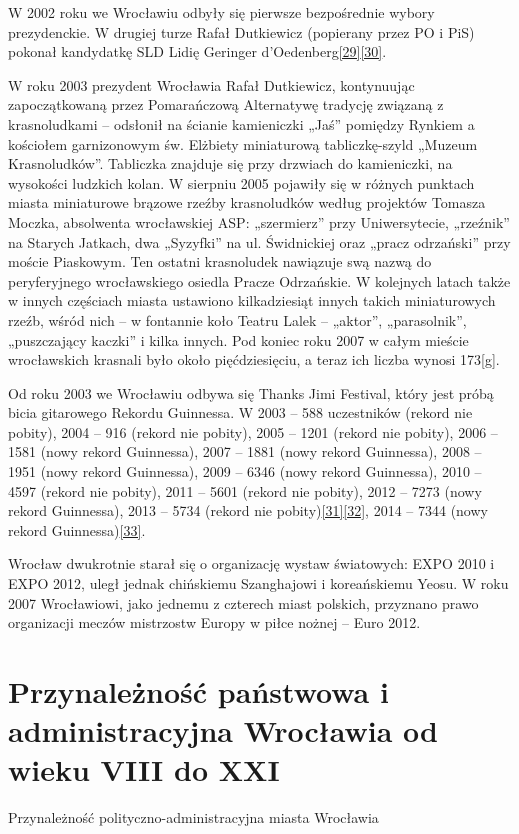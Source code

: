 \documentclass{article}
\begin{document}
W 2002 roku we Wrocławiu odbyły się pierwsze bezpośrednie wybory prezydenckie. W drugiej turze Rafał Dutkiewicz (popierany przez PO i PiS) pokonał kandydatkę SLD Lidię Geringer d’Oedenberg\hyperref[29]{[29]}\hyperref[30]{[30]}.

W roku 2003 prezydent Wrocławia Rafał Dutkiewicz, kontynuując zapoczątkowaną przez Pomarańczową Alternatywę tradycję związaną z krasnoludkami – odsłonił na ścianie kamieniczki „Jaś” pomiędzy Rynkiem a kościołem garnizonowym św. Elżbiety miniaturową tabliczkę-szyld „Muzeum Krasnoludków”. Tabliczka znajduje się przy drzwiach do kamieniczki, na wysokości ludzkich kolan. W sierpniu 2005 pojawiły się w różnych punktach miasta miniaturowe brązowe rzeźby krasnoludków według projektów Tomasza Moczka, absolwenta wrocławskiej ASP: „szermierz” przy Uniwersytecie, „rzeźnik” na Starych Jatkach, dwa „Syzyfki” na ul. Świdnickiej oraz „pracz odrzański” przy moście Piaskowym. Ten ostatni krasnoludek nawiązuje swą nazwą do peryferyjnego wrocławskiego osiedla Pracze Odrzańskie. W kolejnych latach także w innych częściach miasta ustawiono kilkadziesiąt innych takich miniaturowych rzeźb, wśród nich – w fontannie koło Teatru Lalek – „aktor”, „parasolnik”, „puszczający kaczki” i kilka innych. Pod koniec roku 2007 w całym mieście wrocławskich krasnali było około pięćdziesięciu, a teraz ich liczba wynosi 173\hyperref[g]{[g]}.

Od roku 2003 we Wrocławiu odbywa się Thanks Jimi Festival, który jest próbą bicia gitarowego Rekordu Guinnessa. W 2003 – 588 uczestników (rekord nie pobity), 2004 – 916 (rekord nie pobity), 2005 – 1201 (rekord nie pobity), 2006 – 1581 (nowy rekord Guinnessa), 2007 – 1881 (nowy rekord Guinnessa), 2008 – 1951 (nowy rekord Guinnessa), 2009 – 6346 (nowy rekord Guinnessa), 2010 – 4597 (rekord nie pobity), 2011 – 5601 (rekord nie pobity), 2012 – 7273 (nowy rekord Guinnessa), 2013 – 5734 (rekord nie pobity)\hyperref[31]{[31]}\hyperref[32]{[32]}, 2014 – 7344 (nowy rekord Guinnessa)\hyperref[33]{[33]}.

Wrocław dwukrotnie starał się o organizację wystaw światowych: EXPO 2010 i EXPO 2012, uległ jednak chińskiemu Szanghajowi i koreańskiemu Yeosu. W roku 2007 Wrocławiowi, jako jednemu z czterech miast polskich, przyznano prawo organizacji meczów mistrzostw Europy w piłce nożnej – Euro 2012.

\section{Przynależność państwowa i administracyjna Wrocławia od wieku VIII do XXI}
\begin{center}
Przynależność polityczno-administracyjna miasta Wrocławia
\end{center}
\end{document}
